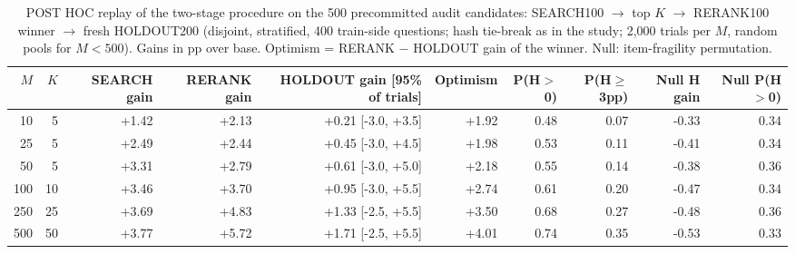 \begin{table}[t]
\centering
\small
\begin{adjustbox}{max width=\linewidth}
\begin{tabular}{rrrrrrrrrr}
\toprule
$M$ & $K$ & SEARCH gain & RERANK gain & HOLDOUT gain [95\% of trials] & Optimism & P(H$>$0) & P(H$\ge$3pp) & Null H gain & Null P(H$>$0) \\
\midrule
10 & 5 & +1.42 & +2.13 & +0.21 [-3.0, +3.5] & +1.92 & 0.48 & 0.07 & -0.33 & 0.34 \\
25 & 5 & +2.49 & +2.44 & +0.45 [-3.0, +4.5] & +1.98 & 0.53 & 0.11 & -0.41 & 0.34 \\
50 & 5 & +3.31 & +2.79 & +0.61 [-3.0, +5.0] & +2.18 & 0.55 & 0.14 & -0.38 & 0.36 \\
100 & 10 & +3.46 & +3.70 & +0.95 [-3.0, +5.5] & +2.74 & 0.61 & 0.20 & -0.47 & 0.34 \\
250 & 25 & +3.69 & +4.83 & +1.33 [-2.5, +5.5] & +3.50 & 0.68 & 0.27 & -0.48 & 0.36 \\
500 & 50 & +3.77 & +5.72 & +1.71 [-2.5, +5.5] & +4.01 & 0.74 & 0.35 & -0.53 & 0.33 \\
\bottomrule
\end{tabular}
\end{adjustbox}
\caption{POST HOC replay of the two-stage procedure on the 500 precommitted audit candidates: SEARCH100 $\to$ top $K$ $\to$ RERANK100 winner $\to$ fresh HOLDOUT200 (disjoint, stratified, 400 train-side questions; hash tie-break as in the study; 2,000 trials per $M$, random pools for $M<500$). Gains in pp over base. Optimism = RERANK $-$ HOLDOUT gain of the winner. Null: item-fragility permutation.}
\label{tab:selection-replay}
\end{table}
